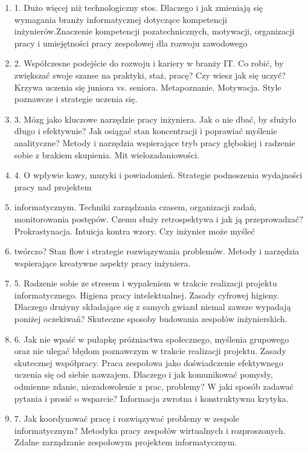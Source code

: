 \documentclass[12pt, a4paper]{article}
\begin{document}
\begin{enumerate}
  \item 1. Dużo więcej niż technologiczny stos. Dlaczego i jak zmieniają się wymagania branży informatycznej dotyczące kompetencji inżynierów.Znaczenie kompetencji pozatechnicznych, motywacji, organizacji pracy i umiejętności pracy zespołowej dla rozwoju zawodowego
  \item 2. Współczesne podejście do rozwoju i kariery w branży IT. Co robić, by zwiększać swoje szanse na praktyki, staż, pracę? Czy wiesz jak się uczyć? Krzywa uczenia się juniora vs. seniora. Metapoznanie. Motywacja. Style poznawcze i strategie uczenia się.
  \item 3. Mózg jako kluczowe narzędzie pracy inżyniera. Jak o nie dbać, by służyło długo i efektywnie? Jak osiągać stan koncentracji i poprawiać myślenie analityczne? Metody i narzędzia wspierające tryb pracy głębokiej i radzenie sobie z brakiem skupienia. Mit wielozadaniowości.
  \item 4. O wpływie kawy, muzyki i powiadomień. Strategie podnoszenia wydajności pracy nad projektem
  \item informatycznym. Techniki zarządzania czasem, organizacji zadań, monitorowania postępów. Czemu służy retrospektywa i jak ją przeprowadzać? Prokrastynacja. Intuicja kontra wzory. Czy inżynier może myśleć
  \item twórczo? Stan flow i strategie rozwiązywania problemów. Metody i narzędzia wspierające kreatywne aspekty pracy inżyniera.
  \item 5. Radzenie sobie ze stresem i wypaleniem w trakcie realizacji projektu informatycznego. Higiena pracy intelektualnej. Zasady cyfrowej higieny. Dlaczego drużyny składające się z samych gwiazd niemal zawsze wypadają poniżej oczekiwań? Skuteczne sposoby budowania zespołów inżynierskich.
  \item 6. Jak nie wpaść w pułapkę próżniactwa społecznego, myślenia grupowego oraz nie ulegać błędom poznawczym w trakcie realizacji projektu. Zasady skutecznej współpracy. Praca zespołowa jako doświadczenie efektywnego uczenia się od siebie nawzajem. Dlaczego i jak komunikować pomysły, odmienne zdanie, niezadowolenie z prac, problemy? W jaki sposób zadawać pytania i prosić o wsparcie? Informacja zwrotna i konstruktywna krytyka.
  \item 7. Jak koordynować pracę i rozwiązywać problemy w zespole informatycznym? Metodyka pracy zespołów wirtualnych i rozproszonych. Zdalne zarządzanie zespołowym projektem informatycznym.
\end{enumerate}
\end{document}
